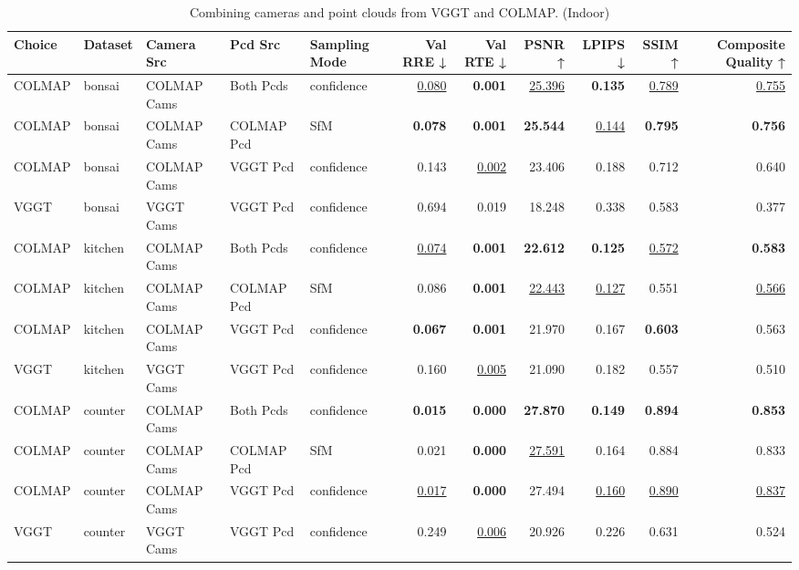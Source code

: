 \begin{table}[H]
\caption{\ifdefined\customcaption \customcaption \else Combining cameras and point clouds from VGGT and COLMAP. (Indoor) \fi}
\label{tab:07_combined_single_brief_indoor}
\centering
\tiny
\begin{tabular}{lllllrrrrrr}
\toprule
Choice & Dataset & Camera Src & Pcd Src & Sampling Mode & Val RRE ↓ & Val RTE ↓ & PSNR ↑ & LPIPS ↓ & SSIM ↑ & Composite Quality ↑ \\
\midrule
COLMAP & bonsai & COLMAP Cams & Both Pcds & confidence & \underline{0.080} & \textbf{0.001} & \underline{25.396} & \textbf{0.135} & \underline{0.789} & \underline{0.755} \\
COLMAP & bonsai & COLMAP Cams & COLMAP Pcd & SfM & \textbf{0.078} & \textbf{0.001} & \textbf{25.544} & \underline{0.144} & \textbf{0.795} & \textbf{0.756} \\
COLMAP & bonsai & COLMAP Cams & VGGT Pcd & confidence & 0.143 & \underline{0.002} & 23.406 & 0.188 & 0.712 & 0.640 \\
VGGT & bonsai & VGGT Cams & VGGT Pcd & confidence & 0.694 & 0.019 & 18.248 & 0.338 & 0.583 & 0.377 \\
\midrule
COLMAP & kitchen & COLMAP Cams & Both Pcds & confidence & \underline{0.074} & \textbf{0.001} & \textbf{22.612} & \textbf{0.125} & \underline{0.572} & \textbf{0.583} \\
COLMAP & kitchen & COLMAP Cams & COLMAP Pcd & SfM & 0.086 & \textbf{0.001} & \underline{22.443} & \underline{0.127} & 0.551 & \underline{0.566} \\
COLMAP & kitchen & COLMAP Cams & VGGT Pcd & confidence & \textbf{0.067} & \textbf{0.001} & 21.970 & 0.167 & \textbf{0.603} & 0.563 \\
VGGT & kitchen & VGGT Cams & VGGT Pcd & confidence & 0.160 & \underline{0.005} & 21.090 & 0.182 & 0.557 & 0.510 \\
\midrule
COLMAP & counter & COLMAP Cams & Both Pcds & confidence & \textbf{0.015} & \textbf{0.000} & \textbf{27.870} & \textbf{0.149} & \textbf{0.894} & \textbf{0.853} \\
COLMAP & counter & COLMAP Cams & COLMAP Pcd & SfM & 0.021 & \textbf{0.000} & \underline{27.591} & 0.164 & 0.884 & 0.833 \\
COLMAP & counter & COLMAP Cams & VGGT Pcd & confidence & \underline{0.017} & \textbf{0.000} & 27.494 & \underline{0.160} & \underline{0.890} & \underline{0.837} \\
VGGT & counter & VGGT Cams & VGGT Pcd & confidence & 0.249 & \underline{0.006} & 20.926 & 0.226 & 0.631 & 0.524 \\
\bottomrule
\end{tabular}
\end{table}